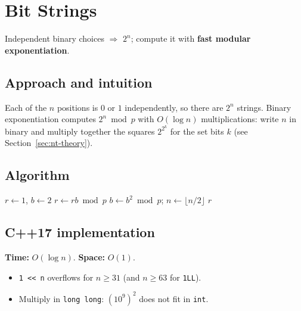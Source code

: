 \section{Bit Strings}
\label{sec:b-bit-strings}


\begin{patternbox}
Independent binary choices $\Rightarrow$ $2^n$; compute it with
\textbf{fast modular exponentiation}.
\end{patternbox}

\subsection*{Approach and intuition}

Each of the $n$ positions is $0$ or $1$ independently, so there are $2^n$
strings. Binary exponentiation computes $2^n\bmod p$ with $O(\log n)$
multiplications: write $n$ in binary and multiply together the squares
$2^{2^k}$ for the set bits $k$ (see Section~\ref{sec:nt-theory}).

\subsection*{Algorithm}
\begin{algorithmic}[1]
\State $r\gets1$, $b\gets2$
   $r\gets rb\bmod p$ \EndIf
  \State $b\gets b^2\bmod p$; $n\gets\lfloor n/2\rfloor$
\EndWhile
\State \Return $r$
\end{algorithmic}


\subsection*{C++17 implementation}

\begin{complexitybox}
\textbf{Time:} $O(\log n)$. \textbf{Space:} $O(1)$.
\end{complexitybox}

\begin{pitfallbox}
\begin{itemize}
  \item \texttt{1 << n} overflows for $n\ge31$ (and $n\ge63$ for
        \texttt{1LL}).
  \item Multiply in \texttt{long long}: $(10^9)^2$ does not fit in \texttt{int}.
\end{itemize}
\end{pitfallbox}
